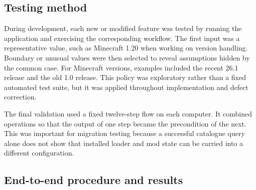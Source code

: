 \subsection{Testing method}

During development, each new or modified feature was tested by running the application and exercising the corresponding workflow. The first input was a representative value, such as Minecraft 1.20 when working on version handling. Boundary or unusual values were then selected to reveal assumptions hidden by the common case. For Minecraft versions, examples included the recent 26.1 release and the old 1.0 release. This policy was exploratory rather than a fixed automated test suite, but it was applied throughout implementation and defect correction.

The final validation used a fixed twelve-step flow on each computer. It combined operations so that the output of one step became the precondition of the next. This was important for migration testing because a successful catalogue query alone does not show that installed loader and mod state can be carried into a different configuration.

\subsection{End-to-end procedure and results}

